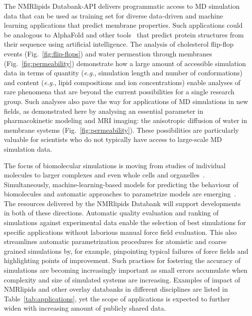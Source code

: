 \documentclass[fleqn,10pt]{wlscirep}
\begin{document}
The NMRlipids Databank-API delivers programmatic access to MD simulation data that can be used as training set for diverse data-driven and machine learning applications that predict membrane properties. Such applications could be analogous to AlphaFold \cite{jumper21} and other tools~\cite{baek21,lin23} that predict protein structures from their sequence using artificial intelligence.
The analysis of cholesterol flip-flop events (Fig.~\ref{fig:flip-flops}) and water permeation through membranes (Fig.~\ref{fig:permeability}) demonstrate how a large amount of accessible simulation data in terms of quantity (\textit{e.g.}, simulation length and number of conformations) and content (\textit{e.g.}, lipid compositions and ion concentrations) enable analyses of rare phenomena that are beyond the current possibilities for a single research group. Such analyses also pave the way for applications of MD simulations in new fields, as demonstrated here by analysing an essential parameter in pharmacokinetic modeling and MRI imaging:\cite{nitsche19,topgaard20} the anisotropic diffusion of water in membrane systems (Fig.~\ref{fig:permeability}). 
These possibilities are particularly valuable for scientists who do not typically have access to large-scale MD simulation data. 

The focus of biomolecular simulations is moving from studies of individual molecules to larger complexes and even whole cells and organelles~\cite{johnson15,thornburg22,gupta22}. Simultaneously, machine-learning-based models for predicting the behaviour of biomolecules and automatic approaches to parametrize models are emerging~\cite{jumper21,antila22b}. The resources delivered by the NMRlipids Databank will support developments in both of these directions. Automatic quality evaluation and ranking of simulations against experimental data enable the selection of best simulations for specific applications without laborious manual force field evaluation. This also streamlines automatic parametrization procedures for atomistic and coarse grained simulations by, for example, pinpointing typical failures of force fields and highlighting points of improvement. Such practises for fostering the accuracy of simulations are becoming increasingly important as small errors accumulate when complexity and size of simulated systems are increasing. Examples of impact of NMRlipids and other overlay databanks in different disciplines are listed in Table~\ref{tab:applications}, yet the scope of applications is expected to further widen with increasing amount of publicly shared data.  
\end{document}
